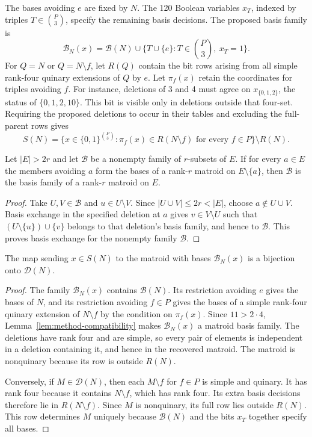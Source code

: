 \documentclass[11pt,letterpaper,titlepage]{article}
\def\B{\mathcal{B}}
\begin{document}
The bases avoiding \(e\) are fixed by \(N\). The 120 Boolean variables \(x_T\), indexed by triples \(T\in\binom{P}{3}\), specify the remaining basis decisions. The proposed basis family is
\[
 \B_N(x)=\B(N)\cup\bigl\{T\cup\{e\}:T\in\textstyle\binom{P}{3},\ x_T=1\bigr\}.
\]
For \(Q=N\) or \(Q=N\setminus f\), let \(R(Q)\) contain the bit rows arising from all simple rank-four quinary extensions of \(Q\) by \(e\). Let \(\pi_f(x)\) retain the coordinates for triples avoiding \(f\). For instance, deletions of 3 and 4 must agree on \(x_{\{0,1,2\}}\), the status of \(\{0,1,2,10\}\). This bit is visible only in deletions outside that four-set. Requiring the proposed deletions to occur in their tables and excluding the full-parent rows gives
\[
 S(N)=\bigl\{x\in\{0,1\}^{\binom{P}{3}}:
 \pi_f(x)\in R(N\setminus f)\text{ for every }f\in P\bigr\}
       \setminus R(N).
\]

\begin{lemma}
\label{lem:method-compatibility}
Let \(|E|>2r\) and let \(\mathcal{B}\) be a nonempty family of \(r\)-subsets of \(E\). If for every \(a\in E\) the members avoiding \(a\) form the bases of a rank-\(r\) matroid on \(E\setminus\{a\}\), then \(\mathcal{B}\) is the basis family of a rank-\(r\) matroid on \(E\).
\end{lemma}
\begin{proof}
Take \(U,V\in\mathcal{B}\) and \(u\in U\setminus V\). Since \(|U\cup V|\leq 2r<|E|\), choose \(a\notin U\cup V\). Basis exchange in the specified deletion at \(a\) gives \(v\in V\setminus U\) such that \((U\setminus\{u\})\cup\{v\}\) belongs to that deletion's basis family, and hence to \(\mathcal{B}\). This proves basis exchange for the nonempty family \(\mathcal{B}\).
\end{proof}

\begin{proposition}
\label{prop:method-recovery}
The map sending \(x\in S(N)\) to the matroid with bases \(\B_N(x)\) is a bijection onto \(\mathcal{D}(N)\).
\end{proposition}
\begin{proof}
The family \(\B_N(x)\) contains \(\B(N)\). Its restriction avoiding \(e\) gives the bases of \(N\), and its restriction avoiding \(f\in P\) gives the bases of a simple rank-four quinary extension of \(N\setminus f\) by the condition on \(\pi_f(x)\). Since \(11>2\cdot 4\), Lemma~\ref{lem:method-compatibility} makes \(\B_N(x)\) a matroid basis family. The deletions have rank four and are simple, so every pair of elements is independent in a deletion containing it, and hence in the recovered matroid. The matroid is nonquinary because its row is outside \(R(N)\).

Conversely, if \(M\in\mathcal{D}(N)\), then each \(M\setminus f\) for \(f\in P\) is simple and quinary. It has rank four because it contains \(N\setminus f\), which has rank four. Its extra basis decisions therefore lie in \(R(N\setminus f)\). Since \(M\) is nonquinary, its full row lies outside \(R(N)\). This row determines \(M\) uniquely because \(\B(N)\) and the bits \(x_T\) together specify all bases.
\end{proof}
\end{document}
